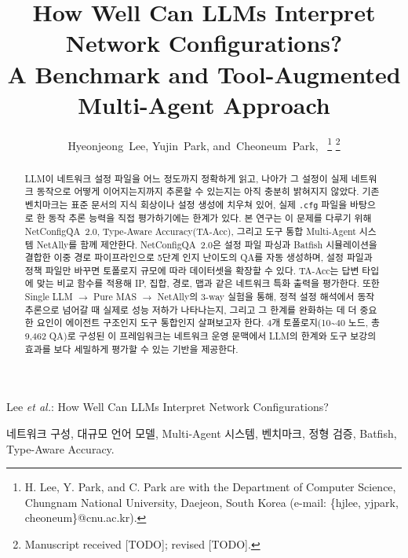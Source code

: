 \documentclass[journal]{IEEEtran}
\begin{document}
\title{How Well Can LLMs Interpret Network Configurations?\\ A Benchmark and Tool-Augmented Multi-Agent Approach}

\author{Hyeonjeong~Lee,
  Yujin~Park,
  and~Cheoneum~Park,~%
  \thanks{H. Lee, Y. Park, and C. Park are with the Department of
    Computer Science, Chungnam National University, Daejeon, South Korea
    (e-mail: \{hjlee, yjpark, cheoneum\}@cnu.ac.kr).}%
  \thanks{Manuscript received [TODO]; revised [TODO].}}

%
{Lee \MakeLowercase{\textit{et al.}}: How Well Can LLMs Interpret Network Configurations?}

\maketitle

\begin{abstract}
  LLM이 네트워크 설정 파일을 어느 정도까지 정확하게 읽고, 나아가 그 설정이 실제 네트워크 동작으로 어떻게 이어지는지까지 추론할 수 있는지는 아직 충분히 밝혀지지 않았다. 기존 벤치마크는 표준 문서의 지식 회상이나 설정 생성에 치우쳐 있어, 실제 \texttt{.cfg} 파일을 바탕으로 한 동작 추론 능력을 직접 평가하기에는 한계가 있다. 본 연구는 이 문제를 다루기 위해 NetConfigQA~2.0, Type-Aware Accuracy(TA-Acc), 그리고 도구 통합 Multi-Agent 시스템 NetAlly를 함께 제안한다. NetConfigQA~2.0은 설정 파일 파싱과 Batfish 시뮬레이션을 결합한 이중 경로 파이프라인으로 5단계 인지 난이도의 QA를 자동 생성하며, 설정 파일과 정책 파일만 바꾸면 토폴로지 규모에 따라 데이터셋을 확장할 수 있다. TA-Acc는 답변 타입에 맞는 비교 함수를 적용해 IP, 집합, 경로, 맵과 같은 네트워크 특화 출력을 평가한다. 또한 Single LLM $\rightarrow$ Pure MAS $\rightarrow$ NetAlly의 3-way 실험을 통해, 정적 설정 해석에서 동작 추론으로 넘어갈 때 실제로 성능 저하가 나타나는지, 그리고 그 한계를 완화하는 데 더 중요한 요인이 에이전트 구조인지 도구 통합인지 살펴보고자 한다. 4개 토폴로지(10\textasciitilde40 노드, 총 9,462 QA)로 구성된 이 프레임워크는 네트워크 운영 문맥에서 LLM의 한계와 도구 보강의 효과를 보다 세밀하게 평가할 수 있는 기반을 제공한다.
\end{abstract}

\begin{IEEEkeywords}
  네트워크 구성, 대규모 언어 모델, Multi-Agent 시스템, 벤치마크, 정형 검증, Batfish, Type-Aware Accuracy.
\end{IEEEkeywords}
\end{document}
